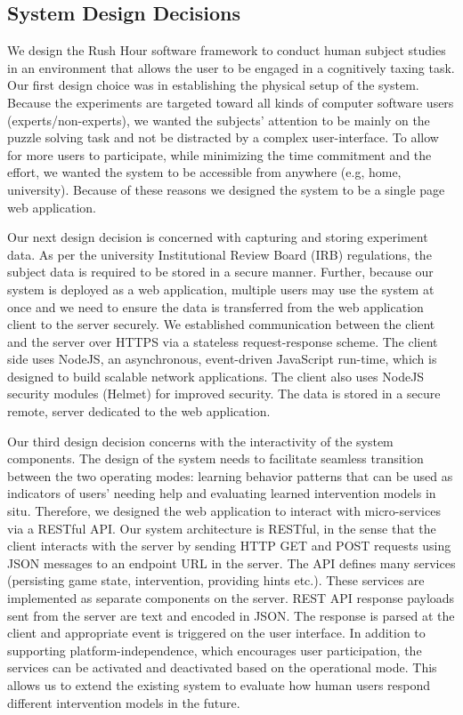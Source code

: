 \subsection{System Design Decisions}
We design the Rush Hour software framework to conduct human subject studies in an environment that allows the user to be engaged in a cognitively taxing task. 
Our first design choice was in establishing the physical setup of the system. 
Because the experiments are targeted toward all kinds of computer software users (experts/non-experts), we wanted the subjects' attention to be mainly on the puzzle solving task and not be distracted by a complex user-interface. 
To allow for more users to participate, while minimizing the time commitment and the effort, we wanted the system to be accessible from anywhere (e.g, home, university). 
Because of these reasons we designed the system to be a single page web application.

Our next design decision is concerned with capturing and storing experiment data. 
As per the university Institutional Review Board (IRB) regulations, the subject data is required to be stored in a secure manner. 
Further, because our system is deployed as a web application, multiple users may use the system at once and we need to ensure the data is transferred from the web application client to the server securely. 
We established communication between the client and the server over HTTPS via a stateless request-response scheme. 
The client side uses NodeJS, an asynchronous, event-driven JavaScript run-time, which is designed to build scalable network applications.  
The client also uses NodeJS security modules (Helmet) for improved security. 
The data is stored in a secure remote, server dedicated to the web application. 

Our third design decision concerns with the interactivity of the system components.
The design of the system needs to facilitate seamless transition between the two operating modes: learning behavior patterns that can be used as indicators of users' needing help and evaluating learned intervention models in situ. 
Therefore,  we designed the web application to interact with micro-services via a RESTful API. 
Our system architecture is RESTful, in the sense that the client interacts with the server by sending HTTP GET and POST requests using JSON messages to an endpoint URL in the server. 
The API defines many services (persisting game state, intervention, providing hints etc.). 
These services are implemented as separate components on the server. 
REST API response payloads sent from the server are text and encoded in JSON. The response is parsed at the client and appropriate event is triggered on the user interface. 
In addition to supporting platform-independence, which encourages user participation, the services can be activated and deactivated based on the operational mode. 
This allows us to extend the existing system to evaluate how human users respond different intervention models in the future.


